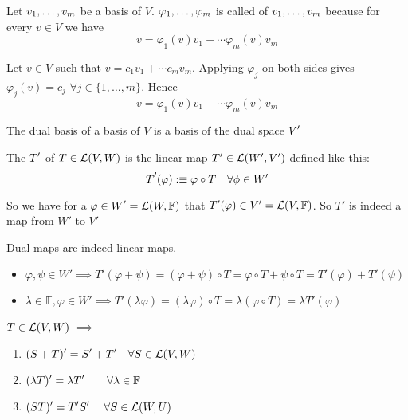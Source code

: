\setcounter{thm}{113}
\begin{thm}
  Let $v_1, \dots, v_m$ be a basis of $V$. $\varphi_1, \dots, \varphi_m$ is called  of $v_1, \dots, v_m$ because for every $v \in V$ we have 
  \begin{equation}
    v=\varphi_1 (v)v_1 + \cdots \varphi_m(v)v_m
  \end{equation}
\end{thm}
\begin{prf}
  Let $v \in V$ such that $v= c_1v_1 + \cdots c_mv_m$. Applying
  $\varphi_j$ on both sides gives $\varphi_j(v)=c_j$ $\forall j\in \{1, \dots, m\}$. Hence
  \begin{equation}
  v=\varphi_1 (v)v_1 + \cdots \varphi_m(v)v_m
  \end{equation}
  \vspace{-1em}
\end{prf}

\setcounter{thm}{115}
\begin{thm}
  The dual basis of a basis of $V$ is a basis of the dual space $\dual{V}$
\end{thm}

\setcounter{thm}{117}
\begin{mydef}
  The  $\dual{T}$ of $T \in \mathcal{L}(V,W)$ is the linear map $T' \in {\mathcal{L}(W', V')}$ defined like this:
\begin{equation}
    \dual{T}(\varphi) :\equiv \varphi \circ T \quad \forall \phi \in W'
\end{equation}

    So we have for a $\varphi \in \dual{W}=\lin{W}{\mathbb{F}}$ that $T'(\varphi) \in V' = {\mathcal{L}(V, \mathbb{F})}$. So $T'$ is indeed a map from $W'$ to $V'$

    Dual maps are indeed linear maps. 
\begin{itemize}
      \item $\varphi, \psi \in W' \implies T' (\varphi + \psi) = (\varphi + \psi) \circ T = \varphi \circ T + \psi \circ T = T' (\varphi) + T'(\psi)$
    \item $\lambda \in \mathbb{F}, \varphi \in W' \implies T' (\lambda \varphi) = (\lambda \varphi) \circ T = \lambda (\varphi \circ T) = \lambda T' (\varphi)$
\end{itemize}


\end{mydef}

\setcounter{thm}{119}
\begin{thm} 
  \label{algebraic-properties-of-dual-maps}
  $T \in \mathcal{L}(V,W)$ $\implies$
  \begin{enumerate}
    \item $\dual{(S+T)} = \dual{S} + \dual{T} \quad \forall S \in \linmap(V,W)$
    \item $\dual{(\lambda T)} = \lambda \dual{T} \quad \quad \forall \lambda \in \myF$
    \item $\dual{(ST)} = \dual{T}\dual{S} \quad \; \forall S \in \linmap (W,U)$
  \end{enumerate}
\end{thm}



